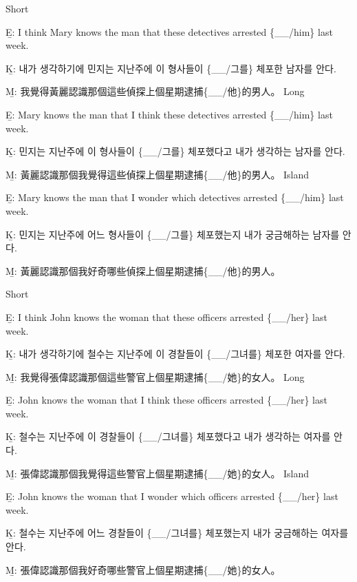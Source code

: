 \pex %
\a Short\par\nobreak
\beginsubsub
\b{E:} I think Mary knows the man that these detectives arrested \{\_\_/him\} last week. \par\nobreak
\b{K:} \ko 내가 생각하기에 민지는 지난주에 이 형사들이 \{\_\_/그를\} 체포한 남자를 안다. \normalfont\par\nobreak
\b{M:} \zh 我覺得黃麗認識那個這些偵探上個星期逮捕\{\_\_/他\}的男人。 \normalfont
\endsubsub
\a Long\par\nobreak
\beginsubsub
\b{E:} Mary knows the man that I think these detectives arrested \{\_\_/him\} last week. \par\nobreak
\b{K:} \ko 민지는 지난주에 이 형사들이 \{\_\_/그를\} 체포했다고 내가 생각하는 남자를 안다. \normalfont\par\nobreak
\b{M:} \zh 黃麗認識那個我覺得這些偵探上個星期逮捕\{\_\_/他\}的男人。 \normalfont
\endsubsub
\a Island\par\nobreak
\beginsubsub
\b{E:} Mary knows the man that I wonder which detectives arrested \{\_\_/him\} last week.\par\nobreak
\b{K:} \ko 민지는 지난주에 어느 형사들이 \{\_\_/그를\} 체포했는지 내가 궁금해하는 남자를 안다\normalfont.\par\nobreak
\b{M:} \zh 黃麗認識那個我好奇哪些偵探上個星期逮捕\{\_\_/他\}的男人。\normalfont
\endsubsub
\xe

\pex %
\a Short\par\nobreak
\beginsubsub
\b{E:} I think John knows the woman that these officers arrested \{\_\_/her\} last week.\par\nobreak
\b{K:} \ko 내가 생각하기에 철수는 지난주에 이 경찰들이 \{\_\_/그녀를\} 체포한 여자를 안다. \normalfont\par\nobreak
\b{M:} \zh 我覺得張偉認識那個這些警官上個星期逮捕\{\_\_/她\}的女人。 \normalfont
\endsubsub
\a Long\par\nobreak
\beginsubsub
\b{E:} John knows the woman that I think these officers arrested \{\_\_/her\} last week. \par\nobreak
\b{K:} \ko 철수는 지난주에 이 경찰들이 \{\_\_/그녀를\} 체포했다고 내가 생각하는 여자를 안다. \normalfont\par\nobreak
\b{M:} \zh 張偉認識那個我覺得這些警官上個星期逮捕\{\_\_/她\}的女人。 \normalfont
\endsubsub
\a Island\par\nobreak
\beginsubsub
\b{E:} John knows the woman that I wonder which officers arrested \{\_\_/her\} last week.\par\nobreak
\b{K:} \ko 철수는 지난주에 어느 경찰들이 \{\_\_/그녀를\} 체포했는지 내가 궁금해하는 여자를 안다\normalfont.\par\nobreak
\b{M:} \zh 張偉認識那個我好奇哪些警官上個星期逮捕\{\_\_/她\}的女人。\normalfont
\endsubsub
\xe

